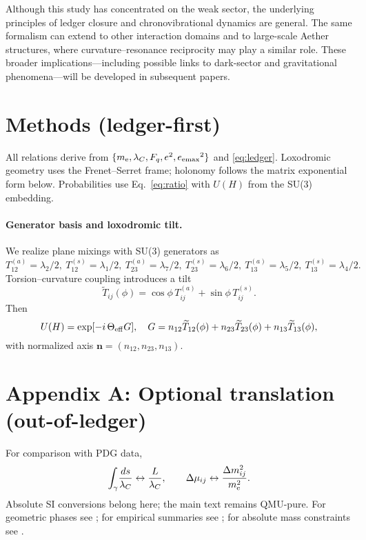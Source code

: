 \documentclass[coverpage]{qadi-article}
\begin{document}
Although this study has concentrated on the weak sector, the underlying principles of ledger closure and chronovibrational dynamics are general.  
The same formalism can extend to other interaction domains and to large-scale Aether structures, where curvature–resonance reciprocity may play a similar role.  
These broader implications—including possible links to dark-sector and gravitational phenomena—will be developed in subsequent papers.

\section*{Methods (ledger-first)}
All relations derive from \(\{m_{\mathrm e},\lambda_C,F_q,e^{2},{e_{\mathrm{emax}}}^{2}\}\) and \eqref{eq:ledger}.  
Loxodromic geometry uses the Frenet–Serret frame; holonomy follows the matrix exponential form below.  
Probabilities use Eq.~\eqref{eq:ratio} with \(U(H)\) from the SU(3) embedding.

\paragraph{Generator basis and loxodromic tilt.}
We realize plane mixings with SU(3) generators as
\(T_{12}^{(a)}=\lambda_2/2,\ T_{12}^{(s)}=\lambda_1/2,\ 
T_{23}^{(a)}=\lambda_7/2,\ T_{23}^{(s)}=\lambda_6/2,\ 
T_{13}^{(a)}=\lambda_5/2,\ T_{13}^{(s)}=\lambda_4/2.\)
Torsion–curvature coupling introduces a tilt
\[
\widetilde T_{ij}(\phi)=\cos\phi\,T_{ij}^{(a)}+\sin\phi\,T_{ij}^{(s)}.
\]
Then
\[
U(H)=\exp[-i\,\Theta_{\rm eff}G],\quad
G=n_{12}\widetilde T_{12}(\phi)+n_{23}\widetilde T_{23}(\phi)+n_{13}\widetilde T_{13}(\phi),
\]
with normalized axis \(\bm n=(n_{12},n_{23},n_{13})\).

\appendix
\section*{Appendix A: Optional translation (out-of-ledger)}
For comparison with PDG data,
\[
\int_\gamma\!\frac{ds}{\lambda_C}\leftrightarrow\frac{L}{\lambda_C},\qquad
\Delta\mu_{ij}\leftrightarrow\frac{\Delta m_{ij}^2}{m_{\mathrm e}^2}.
\]
Absolute SI conversions belong here; the main text remains QMU-pure.
For geometric phases see \cite{Pancharatnam1956,Berry1984,Anandan1992Nature,JohnsFuller2017,JohnsFuller2022};
for empirical summaries see \cite{SuperK1998,SNO2002,KamLAND2003,DayaBay2012,PDG2024Neutrino};
for absolute mass constraints see \cite{KATRIN2025Science,KATRIN2024ArXiv}.
\end{document}
